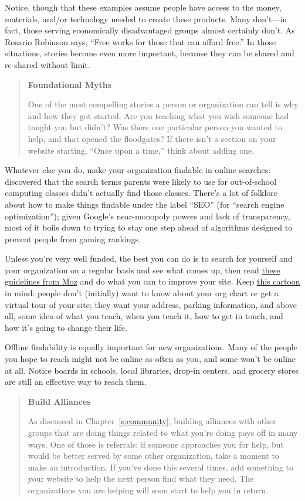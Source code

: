 Notice, though that these examples assume people have access to the
money, materials, and/or technology needed to create these products.
Many don't---in fact, those serving economically disadvantaged groups
almost certainly don't. As Rosario Robinson says, ``Free works for those
that can afford free.'' In those situations, stories become even more
important, because they can be shared and re-shared without limit.

\begin{quote}\setlength{\parindent}{0pt}
\textbf{Foundational Myths}

One of the most compelling stories a person or organization can tell
is why and how they got started. Are you teaching what you wish
someone had taught you but didn't? Was there one particular person you
wanted to help, and that opened the floodgates? If there isn't a
section on your website starting, ``Once upon a time,'' think about
adding one.
\end{quote}

Whatever else you do, make your organization findable in online
searches: \cite{DiSa2014b} discovered that the search terms parents
were likely to use for out-of-school computing classes didn't actually
find those classes. There's a lot of folklore about how to make things
findable under the label ``SEO'' (for ``search engine optimization''); given
Google's near-monopoly powers and lack of transparency, most of it boils
down to trying to stay one step ahead of algorithms designed to prevent
people from gaming rankings.

Unless you're very well funded, the best you can do is to search for
yourself and your organization on a regular basis and see what comes
up, then read \href{https://moz.com/learn/seo/on-page-factors}{these guidelines from Moz} and do what
you can to improve your site. Keep \href{https://xkcd.com/773/}{this cartoon} in
mind: people don't (initially) want to know about your org chart or
get a virtual tour of your site; they want your address, parking
information, and above all, some idea of what you teach, when you
teach it, how to get in touch, and how it's going to change their
life.

Offline findability is equally important for new organizations. Many of
the people you hope to reach might not be online as often as you, and
some won't be online at all. Notice boards in schools, local libraries,
drop-in centers, and grocery stores are still an effective way to reach
them.

\begin{quote}\setlength{\parindent}{0pt}
\textbf{Build Alliances}

As discussed in Chapter~\ref{s:community}, building alliances with
other groups that are doing things related to what you're doing pays
off in many ways. One of those is referrals: if someone approaches you
for help, but would be better served by some other organization, take
a moment to make an introduction. If you've done this several times,
add something to your website to help the next person find what they
need. The organizations you are helping will soon start to help you in
return.
\end{quote}

